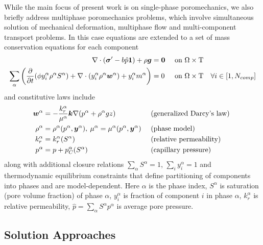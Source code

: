 While the main focus of present work is on single-phase poromechanics, we also briefly address multiphase poromechanics problems, which involve simultaneous solution of mechanical deformation, multiphase flow and multi-component transport problems.   In this case equations  are extended to a set of mass conservation equations for each component
\begin{align}
    \nabla \cdot \left( \bm{\sigma}^\prime - b \hat{p} \bm{1} \right) + \rho\bm{g} &= \bm{0} & \mbox{ on } \Omega \times \mathrm{T} & & \label{eq:momentum_balance_mp} \\
    \sum\limits_\alpha\left(\frac{\partial}{\partial t}(\phi y_i^\alpha \rho^\alpha S^\alpha) + \nabla \cdot (y_i^\alpha \rho^\alpha \bm{w}^\alpha) + y_i^\alpha m^\alpha \right) &= 0 & \mbox{ on } \Omega \times \mathrm{T} & & \forall i \in [1,N_{comp}] \label{eq:mass_balance_mp}
\end{align}
and constitutive laws include
\begin{align}
    \bm{w}^\alpha &= - \frac{k_r^\alpha}{\mu^\alpha}\bm{k}\nabla(p^\alpha + \rho^\alpha g z) & & \mbox{ (generalized Darcy's law) } \label{eq:constitutive_darcy_mp} \\
    \rho^\alpha &= \rho^\alpha(p^\alpha,\bm{y}^\alpha), \: \mu^\alpha = \mu^\alpha(p^\alpha,\bm{y}^\alpha) & & \mbox{ (phase model) } \label{eq:constitutive_fluid_mp} \\
    k_r^\alpha &= k_r^\alpha(S^\alpha) & & \mbox{ (relative permeability) } \label{eq:constitutive_relperm_mp} \\
    p^\alpha &= p + p_C^\alpha(S^\alpha) & & \mbox{ (capillary pressure) } \label{eq:constitutive_cappres_mp}
\end{align}
along with additional closure relations $\sum_\alpha S^\alpha = 1$, $\sum_i y_i^\alpha = 1$ and thermodynamic equilibrium constraints that define partitioning of components into phases and are model-dependent.   Here $\alpha$ is the phase index, $S^\alpha$ is saturation (pore volume fraction) of phase $\alpha$, $y_i^\alpha$ is fraction of component $i$ in phase $\alpha$, $k_r^\alpha$ is relative permeability, $\hat{p} = \sum_\alpha S^\alpha p^\alpha$ is average pore pressure.

\subsection{Solution Approaches}
\label{subsec:intro_problem_solution}

